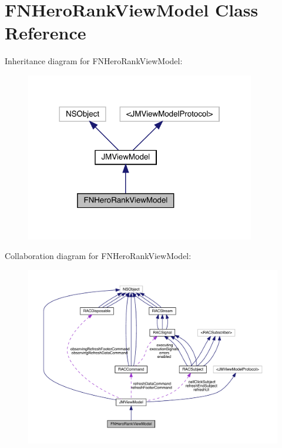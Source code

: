 \hypertarget{interface_f_n_hero_rank_view_model}{}\section{F\+N\+Hero\+Rank\+View\+Model Class Reference}
\label{interface_f_n_hero_rank_view_model}


Inheritance diagram for F\+N\+Hero\+Rank\+View\+Model\+:\nopagebreak
\begin{figure}[H]
\begin{center}
\leavevmode
\includegraphics[width=284pt]{interface_f_n_hero_rank_view_model__inherit__graph}
\end{center}
\end{figure}


Collaboration diagram for F\+N\+Hero\+Rank\+View\+Model\+:\nopagebreak
\begin{figure}[H]
\begin{center}
\leavevmode
\includegraphics[width=350pt]{interface_f_n_hero_rank_view_model__coll__graph}
\end{center}
\end{figure}
